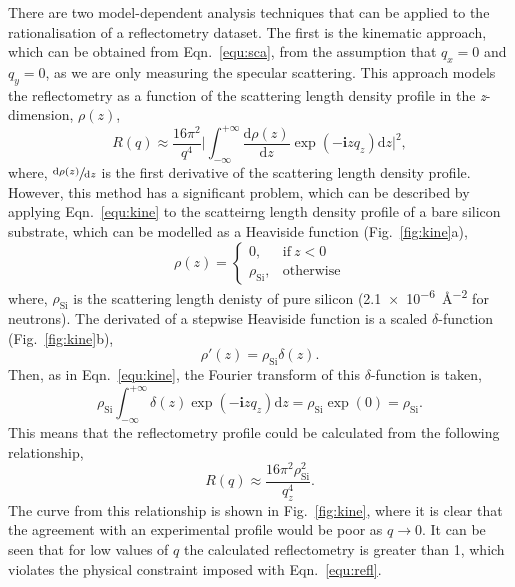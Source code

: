There are two model-dependent analysis techniques that can be applied to the rationalisation of a reflectometry dataset.
The first is the kinematic approach, which can be obtained from Eqn.~\ref{equ:sca}, from the assumption that $q_x = 0$ and $q_y = 0$, as we are only measuring the specular scattering.
This approach models the reflectometry as a function of the scattering length density profile in the \emph{z}-dimension, $\rho(z)$,
%
\begin{equation}
	R(q) \approx \frac{16\pi^2}{q^4}\bigg|\int_{-\infty}^{+\infty}\frac{\text{d}\rho(z)}{\text{d}z}\exp{(-\mathbf{i}zq_z)}\text{d}z\bigg|^2,
	\label{equ:kine}
\end{equation}
%
where, $\sfrac{\text{d}\rho(z)}{\text{d}z}$ is the first derivative of the scattering length density profile.
However, this method has a significant problem, which can be described by applying Eqn.~\ref{equ:kine} to the scatteirng length density profile of a bare silicon substrate, which can be modelled as a Heaviside function (Fig.~\ref{fig:kine}a),
%
\begin{equation}
	\rho(z) =
  \begin{cases}
    0, & \text{if}\ z < 0 \\
    \rho_{\text{Si}}, & \text{otherwise}
  \end{cases}
\end{equation}
%
where, $\rho_{\text{Si}}$ is the scattering length denisty of pure silicon (\SI{2.1e-6}{\angstrom^{-2}} for neutrons).
The derivated of a stepwise Heaviside function is a scaled $\delta$-function (Fig.~\ref{fig:kine}b),
%
\begin{equation}
	\rho'(z) = \rho_{\text{Si}}\delta(z).
\end{equation}
%
Then, as in Eqn.~\ref{equ:kine}, the Fourier transform of this $\delta$-function is taken,
%
\begin{equation}
	\rho_{\text{Si}}\int_{-\infty}^{+\infty}\delta(z)\exp{(-\mathbf{i}zq_z)}\text{d}z = \rho_{\text{Si}}\exp(0) = \rho_{\text{Si}}.
\end{equation}
%
This means that the reflectometry profile could be calculated from the following relationship,
%
\begin{equation}
	R(q)\approx \frac{16\pi^2\rho_{\text{Si}}^2}{q_z^4}.
\end{equation}
%
The curve from this relationship is shown in Fig.~\ref{fig:kine}, where it is clear that the agreement with an experimental profile would be poor as $q \rightarrow 0$.
It can be seen that for low values of $q$ the calculated reflectometry is greater than 1, which violates the physical constraint imposed with Eqn.~\ref{equ:refl}.
